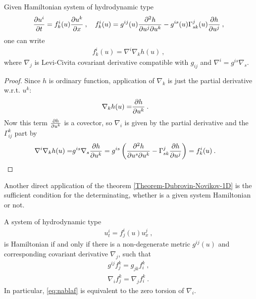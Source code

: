 \begin{proposition}
    Given Hamiltonian system of hydrodynamic type
    \begin{align}
        \frac{\partial u^i}{\partial t} = f^i_k(u) \frac{\partial u^k}{\partial x} \:, \quad f^i_k(u) = g^{ij}(u) \frac{\partial^2 h}{\partial u^j \partial u^k} - g^{is}(u) \Gamma^j_{sk}(u) \frac{\partial h}{\partial u^j} \:, \label{eq:hamiltonovsky-system}
    \end{align}
    one can write
    \begin{align}
        f^i_k(u) = \nabla^i \nabla_k h(u) \:, 
    \end{align}
    where $\nabla_j$ is Levi-Civita covariant derivative compatible with $g_{ij}$ and $\nabla^i = g^{is} \nabla_s$. 
\end{proposition}
\begin{proof}
    Since $h$ is ordinary function, application of $\nabla_k$ is just the partial derivative w.r.t. $u^k$:
    \begin{align}
        \nabla_k h(u) =& \frac{\partial h}{\partial u^k} \:.
    \end{align}
    Now this term $\frac{\partial h}{\partial u^k}$ is a covector, so $\nabla_i$ is given by the partial derivative and the $\Gamma_{ij}^k$ part by
    \begin{align}
        \nabla^i \nabla_k h(u) =& g^{is} \nabla_s \frac{\partial h}{\partial u^k} = g^{is} \left( \frac{\partial^2 h}{\partial u^s \partial u^k} - \Gamma^j_{sk} \frac{\partial h}{\partial u^j} \right) = f^i_k(u) \:.
    \end{align}
\end{proof}

Another direct application of the theorem \vref{Theorem-Dubrovin-Novikov-1D} is the sufficient condition for the determinating, whether is a given system Hamiltonian or not.

\begin{theorem}
    
    A system of hydrodynamic type 
    \begin{align}
        u^i_t = f^i_j(u) u^j_x \:,
    \end{align}
    is Hamiltonian if and only if there is a non-degenerate metric $g^{ij}(u)$ and corresponding covariant derivative $\nabla_j$, such that
    \begin{align}
        g^{ij} f^k_j = g_{jk} f^k_i \:, \label{eq:gf=gf} \\
        \nabla_i f^k_j = \nabla_j f^k_i \label{eq:nablaf} \:.
    \end{align}
    In particular, \eqref{eq:nablaf} is equivalent to the zero torsion of $\nabla_i$.
\end{theorem}

